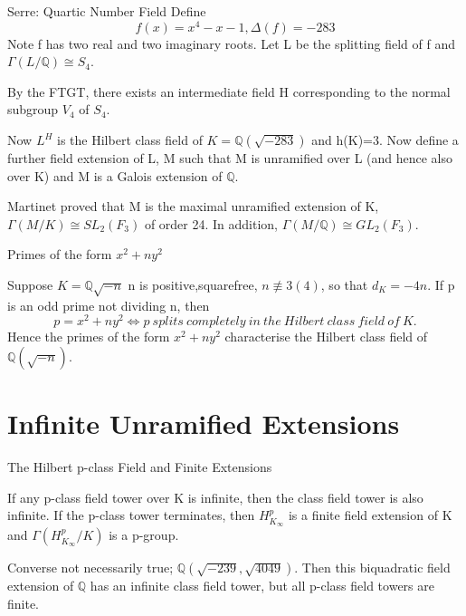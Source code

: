 \documentclass[10pt]{beamer}
\theoremstyle{plain} %
\begin{document}
\begin{frame}{Serre: Quartic Number Field}
Define  \begin{equation}
    f(x)=x^4-x-1, \Delta(f)=-283
\end{equation}
Note f has two real and two imaginary roots. Let  L be the splitting field of f and $\Gamma(L/\mathbb{Q})\cong S_4$.\par
By the FTGT, there exists an intermediate field H corresponding to the normal subgroup $V_4$ of $S_4$. \par 
Now $L^H$ is the Hilbert class field of $K= \mathbb{Q}(\sqrt{-283})$ and h(K)=3. Now define a further field extension of L, M such that M is unramified over L (and hence also over K) and M is a Galois extension of $\mathbb{Q}$.  
\par Martinet proved that M is the maximal unramified extension of K, $\Gamma(M/K)\cong SL_2(F_3)$ of order 24. In addition, $\Gamma(M/\mathbb{Q})\cong GL_2(F_3)$. 
\end{frame}

\begin{frame}{Primes of the form $x^2+ny^2$}
    \begin{corollary}
Suppose $K=\mathbb{Q}{\sqrt{-n}}$ n is positive,squarefree, $n\not\equiv 3(4)$, so that $d_K=-4n$. If p is an odd prime not dividing n, then
\begin{equation} p=x^2+ny^2 \Longleftrightarrow p\:splits\:completely\:in\:the\:Hilbert\:class\:field\:of\:K.
\end{equation}
Hence the primes of the form $x^2+ny^2$ characterise the Hilbert class field of $\mathbb{Q}(\sqrt{-n})$.
\end{corollary}
\end{frame}

\section{Infinite Unramified Extensions}

\begin{frame}{The Hilbert p-class Field and Finite Extensions}
    \begin{Theorem}
If any p-class field tower over K is infinite, then the class field tower is also infinite. If the p-class tower terminates, then $H_{K_\infty}^{p}$ is a finite field extension of K and $\Gamma(H_{K_\infty}^{p}/K)$ is a p-group.
\end{Theorem}
Converse not necessarily true; $\mathbb{Q}(\sqrt{-239},\sqrt{4049})$. Then this biquadratic field extension of $\mathbb{Q}$ has an infinite class field tower, but all p-class field towers are finite. 
\end{frame}
\end{document}
